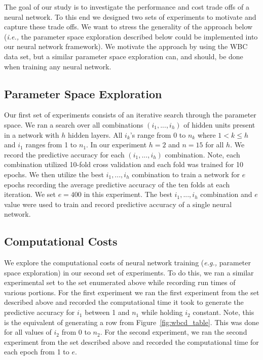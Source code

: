 The goal of our study is to investigate the performance and cost trade offs of a neural network.
To this end we designed two sets of experiments to motivate and capture these trade offs.
We want to stress the generality of the approach below ({\em i.e.,} the parameter space exploration described below could be implemented into our neural network framework).
We motivate the approach by using the WBC data set, but a similar parameter space exploration can, and should, be done when training any neural network.

\subsection{Parameter Space Exploration}
\label{subsec:parameter}
Our first set of experiments consists of an iterative search through the parameter space.
We ran a search over all combinations \((i_1,...,i_h)\) of hidden units present in a network with \(h\) hidden layers.
All \(i_k\)'s range from 0 to \(n_k\) where \(1 < k \leq h\) and \(i_1\) ranges from 1 to \(n_1\).
In our experiment \(h=2\) and \(n=15\) for all \(h\).
We record the predictive accuracy for each \((i_1,...,i_h)\) combination.
Note, each combination utilized 10-fold cross validation and each fold was trained for 10 epochs.
We then utilize the best \(i_1,...,i_h\) combination to train a network for \(e\) epochs recording the average predictive accuracy of the ten folds at each iteration.
We set \(e=400\) in this experiment.
The best \(i_1,...,i_h\) combination and \(e\) value were used to train and record predictive accuracy of a single neural network.

\subsection{Computational Costs}
\label{subsec:cost}
We explore the computational costs of neural network training ({\em e.g.,} parameter space exploration) in our second set of experiments.
To do this, we ran a similar experimental set to the set enumerated above  while recording run times of various portions.
For the first experiment we ran the first experiment from the set described above and recorded the computational time it took to generate the predictive accuracy for \(i_1\) between 1 and \(n_1\) while holding \(i_2\) constant.
Note, this is the equivalent of generating a row from Figure~\ref{fig:wbcd_table}.
This was done for all values of \(i_2\) from 0 to \(n_2\).
For the second experiment, we ran the second experiment from the set described above and recorded the computational time for each epoch from 1 to \(e\).

